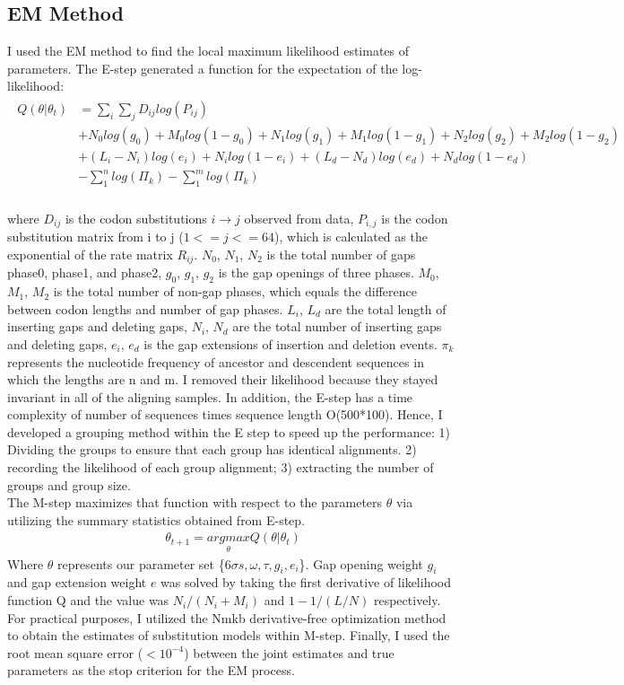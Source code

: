 \subsection{EM Method}
I used the EM method to find the local maximum likelihood estimates of parameters. The E-step generated a function for the expectation of the log-likelihood: 
\begin{gather*} 
\begin{aligned}
 Q(\theta|\theta_{t}) 
 &= \sum_{i}\sum_{j} D_{ij}log(P_{ij})\\
 &+ N_0log(g_0) + M_0log(1-g_0) + N_1log(g_1) + M_1log(1-g_1) + N_2log(g_2) + M_2log(1-g_2) \\
 &+ (L_i - N_i)log(e_i) + N_{i}log(1-e_i) +  (L_d - N_d)log(e_d) + N_{d}log(1-e_d)\\
 &- \sum_{1}^n log(\Pi_{k}) - \sum_{1}^m log(\Pi_{k})
\end{aligned}
\end{gather*}
\\
\noindent where $D_{ij}$ is the codon substitutions $i \rightarrow j$ observed from data, $P_{i,j}$ is the codon substitution matrix from i to j ($1 <= j <= 64$), which is calculated as the exponential of the rate matrix $R_{ij}$. $N_0$, $N_1$, $N_2$ is the total number of gaps phase0, phase1, and phase2, $g_0$, $g_1$, $g_2$ is the gap openings of three phases. $M_0$, $M_1$, $M_2$ is the total number of non-gap phases, which equals the difference between codon lengths and number of gap phases. $L_i$, $L_d$ are the total length of inserting gaps and deleting gaps, $N_i$, $N_d$ are the total number of inserting gaps and deleting gaps, $e_i$, $e_d$ is the gap extensions of insertion and deletion events. $\pi_k$ represents the nucleotide frequency of ancestor and descendent sequences in which the lengths are n and m. I removed their likelihood because they stayed invariant in all of the aligning samples. In addition, the E-step has a time complexity of number of sequences times sequence length O(500*100). Hence, I developed a grouping method within the E step to speed up the performance: 1) Dividing the groups to ensure that each group has identical alignments. 2) recording the likelihood of each group alignment; 3) extracting the number of groups and group size. \\
\indent The M-step maximizes that function with respect to the parameters $\theta$ via utilizing the summary statistics obtained from E-step. 
\begin{gather*}
              \theta_{t+1} = \underset{\theta}{argmax}Q(\theta |\theta_{t})
\end{gather*}
Where $\theta$ represents our parameter set \{$6\sigma s, \omega,\tau, g_i,e_i$\}. Gap opening weight $g_i$ and gap extension weight $e$ was solved by taking the first derivative of likelihood function Q and the value was $N_i/(N_i+M_i)$ and $1-1/(L/N)$ respectively. For practical purposes, I utilized the Nmkb derivative-free optimization method to obtain the estimates of substitution models within M-step. Finally, I used the root mean square error ($<10^{-4}$) between the joint estimates and true parameters as the stop criterion for the EM process.    

